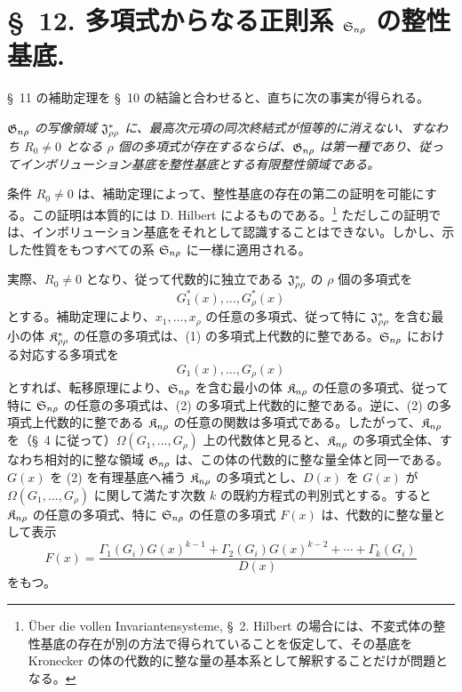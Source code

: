 \documentclass[11pt]{jlreq}
\begin{document}
\section*{\S\ 12. 多項式からなる正則系 $\mathfrak{S}_{n\rho}$ の整性基底.}

\S\ 11 の補助定理を \S\ 10 の結論と合わせると、直ちに次の事実が得られる。

\emph{$\mathfrak{G}_{n\rho}$ の写像領域 $\mathfrak{J}^*_{\rho\rho}$ に、最高次元項の同次終結式が恒等的に消えない、すなわち $R_0\ne0$ となる $\rho$ 個の多項式が存在するならば、$\mathfrak{G}_{n\rho}$ は第一種であり、従ってインボリューション基底を整性基底とする有限整性領域である。}

条件 $R_0\ne0$ は、補助定理によって、整性基底の存在の第二の証明を可能にする。この証明は本質的には D. Hilbert によるものである。\footnote{Über die vollen Invariantensysteme, \S\ 2. Hilbert の場合には、不変式体の整性基底の存在が別の方法で得られていることを仮定して、その基底を Kronecker の体の代数的に整な量の基本系として解釈することだけが問題となる。} ただしこの証明では、インボリューション基底をそれとして認識することはできない。しかし、示した性質をもつすべての系 $\mathfrak{S}_{n\rho}$ に一様に適用される。

実際、$R_0\ne0$ となり、従って代数的に独立である $\mathfrak{J}^*_{\rho\rho}$ の $\rho$ 個の多項式を
\begin{equation}
  G_1^*(x),\ldots,G_\rho^*(x)
\tag{1}
\end{equation}
とする。補助定理により、$x_1,\ldots,x_\rho$ の任意の多項式、従って特に $\mathfrak{J}^*_{\rho\rho}$ を含む最小の体 $\mathfrak{K}^*_{\rho\rho}$ の任意の多項式は、(1) の多項式上代数的に整である。$\mathfrak{S}_{n\rho}$ における対応する多項式を
\begin{equation}
  G_1(x),\ldots,G_\rho(x)
\tag{2}
\end{equation}
とすれば、転移原理により、$\mathfrak{S}_{n\rho}$ を含む最小の体 $\mathfrak{K}_{n\rho}$ の任意の多項式、従って特に $\mathfrak{S}_{n\rho}$ の任意の多項式は、(2) の多項式上代数的に整である。逆に、(2) の多項式上代数的に整である $\mathfrak{K}_{n\rho}$ の任意の関数は多項式である。したがって、$\mathfrak{K}_{n\rho}$ を（\S\ 4 に従って）$\Omega(G_1,\ldots,G_\rho)$ 上の代数体と見ると、$\mathfrak{K}_{n\rho}$ の多項式全体、すなわち相対的に整な領域 $\mathfrak{G}_{n\rho}$ は、この体の代数的に整な量全体と同一である。$G(x)$ を (2) を有理基底へ補う $\mathfrak{K}_{n\rho}$ の多項式とし、$D(x)$ を $G(x)$ が $\Omega(G_1,\ldots,G_\rho)$ に関して満たす次数 $k$ の既約方程式の判別式とする。すると $\mathfrak{K}_{n\rho}$ の任意の多項式、特に $\mathfrak{S}_{n\rho}$ の任意の多項式 $F(x)$ は、代数的に整な量として表示
\begin{equation}
  F(x)=\frac{\Gamma_1(G_i)G(x)^{k-1}+\Gamma_2(G_i)G(x)^{k-2}+\cdots+\Gamma_k(G_i)}{D(x)}
\tag{3}
\end{equation}
をもつ。
\end{document}
